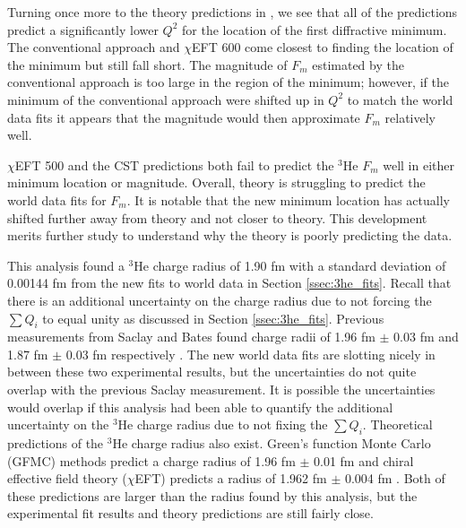 Turning once more to the theory predictions in \cite{Article:Marcucci}, we see that all of the predictions predict a significantly lower $Q^2$ for the location of the first diffractive minimum. The conventional approach and $\chi$EFT 600 come closest to finding the location of the minimum but still fall short. The magnitude of $F_m$ estimated by the conventional approach is too large in the region of the minimum; however, if the minimum of the conventional approach were shifted up in $Q^2$ to match the world data fits it appears that the magnitude would then approximate $F_m$ relatively well. 

$\chi$EFT 500 and the CST predictions both fail to predict the $^3$He $F_m$ well in either minimum location or magnitude. Overall, theory is struggling to predict the world data fits for $F_m$. It is notable that the new minimum location has actually shifted further away from theory and not closer to theory. This development merits further study to understand why the theory is poorly predicting the data. 

This analysis found a $^3$He charge radius of 1.90 fm with a standard deviation of 0.00144 fm from the new fits to world data in Section \ref{ssec:3he_fits}. Recall that there is an additional uncertainty on the charge radius due to not forcing the $\sum Q_i$ to equal unity as discussed in Section \ref{ssec:3he_fits}. Previous measurements from Saclay and Bates found charge radii of 1.96 fm $\pm$ 0.03 fm and 1.87 fm $\pm$ 0.03 fm respectively \cite{3h_proposal}. The new world data fits are slotting nicely in between these two experimental results, but the uncertainties do not quite overlap with the previous Saclay measurement. It is possible the uncertainties would overlap if this analysis had been able to quantify the additional uncertainty on the $^3$He charge radius due to not fixing the $\sum Q_i$. Theoretical predictions of the $^3$He charge radius also exist. Green's function Monte Carlo (GFMC) methods predict a charge radius of 1.96 fm $\pm$ 0.01 fm and chiral effective field theory ($\chi$EFT) predicts a radius of 1.962 fm $\pm$ 0.004 fm \cite{3h_proposal}. Both of these predictions are larger than the radius found by this analysis, but the experimental fit results and theory predictions are still fairly close.

